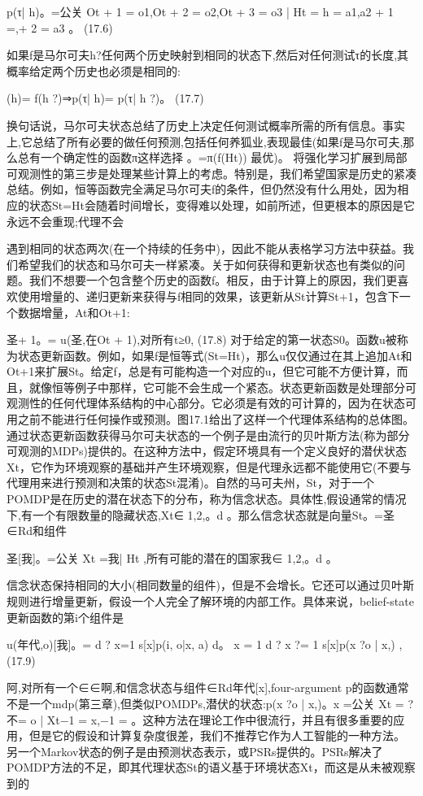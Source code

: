 p(τ| h)。=公关{ Ot + 1 = o1,Ot + 2 = o2,Ot + 3 = o3 | Ht = h = a1,a2 + 1 =,+ 2 = a3 }。
(17.6)

如果f是马尔可夫h?任何两个历史映射到相同的状态下,然后对任何测试τ的长度,其概率给定两个历史也必须是相同的:

(h)= f(h ?)⇒p(τ| h)= p(τ| h ?)。 					(17.7)

换句话说，马尔可夫状态总结了历史上决定任何测试概率所需的所有信息。事实上,它总结了所有必要的做任何预测,包括任何养狐业,表现最佳(如果f是马尔可夫,那么总有一个确定性的函数π这样选择
。=π(f(Ht))
最优)。
将强化学习扩展到局部可观测性的第三步是处理某些计算上的考虑。特别是，我们希望国家是历史的紧凑总结。例如，恒等函数完全满足马尔可夫f的条件，但仍然没有什么用处，因为相应的状态St=Ht会随着时间增长，变得难以处理，如前所述，但更根本的原因是它永远不会重现;代理不会


遇到相同的状态两次(在一个持续的任务中)，因此不能从表格学习方法中获益。我们希望我们的状态和马尔可夫一样紧凑。关于如何获得和更新状态也有类似的问题。我们不想要一个包含整个历史的函数f。相反，由于计算上的原因，我们更喜欢使用增量的、递归更新来获得与f相同的效果，该更新从St计算St+1，包含下一个数据增量，At和Ot+1:

圣+ 1。= u(圣,在Ot + 1),对所有t≥0, 					(17.8)
对于给定的第一状态S0。函数u被称为状态更新函数。例如，如果f是恒等式(St=Ht)，那么u仅仅通过在其上追加At和Ot+1来扩展St。给定f，总是有可能构造一个对应的u，但它可能不方便计算，而且，就像恒等例子中那样，它可能不会生成一个紧态。状态更新函数是处理部分可观测性的任何代理体系结构的中心部分。它必须是有效的可计算的，因为在状态可用之前不能进行任何操作或预测。图17.1给出了这样一个代理体系结构的总体图。
通过状态更新函数获得马尔可夫状态的一个例子是由流行的贝叶斯方法(称为部分可观测的MDPs)提供的。在这种方法中，假定环境具有一个定义良好的潜伏状态Xt，它作为环境观察的基础并产生环境观察，但是代理永远都不能使用它(不要与代理用来进行预测和决策的状态St混淆)。自然的马可夫州，St，对于一个POMDP是在历史的潜在状态下的分布，称为信念状态。具体性,假设通常的情况下,有一个有限数量的隐藏状态,Xt∈{ 1,2,。d }。那么信念状态就是向量St。=圣∈Rd和组件

圣[我]。=公关{ Xt =我| Ht },所有可能的潜在的国家我∈{ 1,2,。d }。

信念状态保持相同的大小(相同数量的组件)，但是不会增长。它还可以通过贝叶斯规则进行增量更新，假设一个人完全了解环境的内部工作。具体来说，belief-state更新函数的第i个组件是


u(年代,o)[我]。=
d ?
x=1 s[x]p(i, o|x, a) d。
x = 1
d ?
x ?= 1 s[x]p(x ?o | x,)
, 					(17.9)


阿,对所有一个∈∈啊,和信念状态与组件∈Rd年代[x],four-argument p的函数通常不是一个mdp(第三章),但类似POMDPs,潜伏的状态:p(x ?o | x,)。x =公关{ Xt = ?不= o | Xt−1 = x,−1 = }。这种方法在理论工作中很流行，并且有很多重要的应用，但是它的假设和计算复杂度很差，我们不推荐它作为人工智能的一种方法。
另一个Markov状态的例子是由预测状态表示，或PSRs提供的。PSRs解决了POMDP方法的不足，即其代理状态St的语义基于环境状态Xt，而这是从未被观察到的


